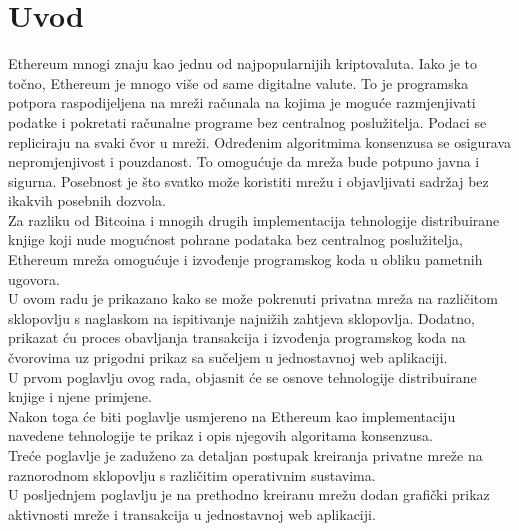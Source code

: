 \documentclass[times, utf8, zavrsni]{fer}
\begin{document}
\chapter{Uvod}
Ethereum mnogi znaju kao jednu od najpopularnijih kriptovaluta. Iako je to točno, Ethereum je mnogo
više od same digitalne valute. To je programska potpora raspodijeljena na mreži računala na kojima je
moguće razmjenjivati podatke i pokretati računalne programe bez centralnog poslužitelja. 
Podaci se repliciraju na svaki čvor u mreži. Određenim algoritmima konsenzusa se osigurava 
nepromjenjivost i pouzdanost. 
To omogućuje da mreža bude potpuno javna i sigurna. Posebnost je što svatko može koristiti
mrežu i objavljivati sadržaj bez ikakvih posebnih dozvola. \\ Za razliku od Bitcoina
i mnogih drugih implementacija tehnologije distribuirane knjige koji nude mogućnost pohrane podataka
bez centralnog poslužitelja, Ethereum mreža omogućuje i izvođenje programskog koda u obliku pametnih ugovora.\\
U ovom radu je prikazano kako se može pokrenuti privatna mreža na različitom sklopovlju s naglaskom
na ispitivanje najnižih zahtjeva sklopovlja. Dodatno, prikazat ću proces obavljanja transakcija
i izvođenja programskog koda na čvorovima uz prigodni prikaz sa sučeljem u jednostavnoj web aplikaciji.\\
U prvom poglavlju ovog rada, objasnit će se osnove tehnologije distribuirane knjige i njene primjene.\\
Nakon toga će biti poglavlje usmjereno na Ethereum kao implementaciju navedene tehnologije te prikaz
i opis njegovih algoritama konsenzusa. \\
Treće poglavlje je zaduženo za detaljan postupak kreiranja privatne mreže na raznorodnom sklopovlju
s različitim operativnim sustavima. \\
U posljednjem poglavlju je na prethodno kreiranu mrežu dodan grafički prikaz aktivnosti mreže i transakcija
u jednostavnoj web aplikaciji. 
\end{document}
